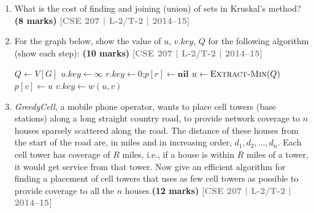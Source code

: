 \documentclass[12pt,a3paper]{article}
\newcommand{\yr}[1]{\hfill\textcolor{gray}{\small\textbf{[#1]}}}
\newcommand{\mk}[1]{\textcolor{orange!70!black}{\small\textbf{(#1 marks)}}}
\begin{document}
\begin{enumerate}
\begin{center}

\end{center}

\item What is the cost of finding and joining (union) of sets in Kruskal's method? \mk{8}
\yr{CSE 207 | L-2/T-2 | 2014--15}

\item For the graph below, show the value of $u$, $v.key$, $Q$ for the following algorithm (show each step):  \mk{10}
\yr{CSE 207 | L-2/T-2 | 2014--15}

\begin{algorithm}[H]
\caption{\textsc{MST}($G,\, w,\, r$)}
\begin{algorithmic}[1]
\State $Q \gets V[G]$
    \State $u.key \gets \infty$
\EndFor
\State $r.key \gets 0$;\quad $p[r] \gets \textbf{nil}$
    \State $u \gets \textsc{Extract-Min}(Q)$
            \State $p[v] \gets u$
            \State $v.key \gets w(u,v)$
        \EndIf
    \EndFor
\EndWhile
\end{algorithmic}
\end{algorithm}

\item  \textit{GreedyCell}, a mobile phone operator, wants to place cell towers 
(base stations) along a long straight country road, to provide network coverage to $n$ 
houses sparsely scattered along the road. The distance of these houses from the start 
of the road are, in miles and in increasing order, $d_1, d_2, \ldots, d_n$. Each cell 
tower has coverage of $R$ miles, i.e., if a house is within $R$ miles of a tower, it 
would get service from that tower. Now give an efficient algorithm for finding a 
placement of cell towers that uses as few cell towers as possible to provide coverage 
to all the $n$ houses.\mk{12}
\yr{CSE 207 | L-2/T-2 | 2014--15}


\end{enumerate}
\end{document}
